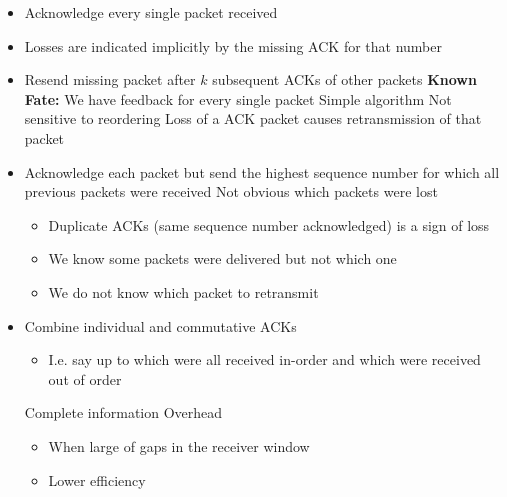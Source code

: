\begin{itemize}
\begin{itemize}
                \begin{itemize}
                    \item Acknowledge every single packet received
                    \item Losses are indicated implicitly by the missing ACK for that number
                    \item Resend missing packet after $k$ subsequent ACKs of other packets
                    \ipro \textbf{Known Fate:} We have feedback for every single packet
                    \ipro Simple algorithm
                    \ipro Not sensitive to reordering
                    \icon Loss of a ACK packet causes retransmission of that packet
                \end{itemize}
                \begin{itemize}
                    \item Acknowledge each packet but send the highest sequence number for which all previous packets were received
                    \icon Not obvious which packets were lost
                        \begin{itemize}
                            \item Duplicate ACKs (same sequence number acknowledged) is a sign of loss
                            \item We know some packets were delivered but not which one
                            \item We do not know which packet to retransmit
                        \end{itemize}
                \end{itemize}
                \begin{itemize}
                    \item Combine individual and commutative ACKs
                        \begin{itemize}
                            \item I.e. say up to which were all received in-order and which were received out of order
                        \end{itemize}
                    \ipro Complete information
                    \icon Overhead
                        \begin{itemize}
                            \item When large of gaps in the receiver window
                            \item Lower efficiency

\end{itemize}
\end{itemize}
\end{itemize}
\end{itemize}
